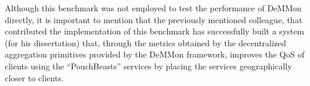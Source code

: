 Although this benchmark was not employed to test the performance of DeMMon directly, it is important to mention that the previously mentioned colleague, that contributed the implementation of this benchmark has successfully built a system (for his dissertation) that, through the metrics obtained by the decentralized aggregation primitives provided by the DeMMon framework, improves the QoS of clients using the ``PouchBeasts'' services by placing the services geographically closer to clients.